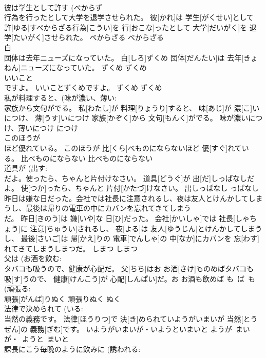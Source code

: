 \documentclass[8pt]{extreport}
\begin{document}
\begin{CJK}{UTF8}{min}
\\	彼は学生として許す (べからず 
\\	行為を行ったとして大学を退学させられた。	彼[かれ]は 学生[がくせい]として 許[ゆる]すべからざる行為[こうい]を 行[おこな]ったとして 大学[だいがく]を 退学[たいがく]させられた。	べからざる	べからざる	
\\	白 
\\	団体は去年ニューズになっていた。	白[しろ]ずくめ 団体[だんたい]は 去年[きょねん]ニューズになっていた。	ずくめ	ずくめ	
\\	いいこと 
\\	ですよ。	いいことずくめですよ。	ずくめ	ずくめ	
\\	私が料理すると、(味が濃い、薄い: 
\\	家族から文句がでる。	私[わたし]が 料理[りょうり]すると、 味[あじ]が 濃[こ]いにつけ、 薄[うす]いにつけ 家族[かぞく]から 文句[もんく]がでる。	味が濃いにつけ、薄いにつけ	につけ	
\\	このほうが 
\\	ほど優れている。	このほうが 比[くら]べものにならないほど 優[すぐ]れている。	比べものにならない	比べものにならない	
\\	道具が (出す: 
\\	だよ。使ったら、ちゃんと片付けなさい。	道具[どうぐ]が 出[だ]しっぱなしだよ。 使[つか]ったら、ちゃんと 片付[かたづ]けなさい。	出しっぱなし	っぱなし	
\\	昨日は嫌な日だった。会社では社長に注意されるし、夜は友人とけんかしてしまうし、最後は帰りの電車の中にカバンを忘れてきてしまう 
\\	だ。	昨日[きのう]は 嫌[いや]な 日[ひ]だった。 会社[かいしゃ]では 社長[しゃちょう]に 注意[ちゅうい]されるし、 夜[よる]は 友人[ゆうじん]とけんかしてしまうし、 最後[さいご]は 帰[かえ]りの 電車[でんしゃ]の 中[なか]にカバンを 忘[わす]れてきてしまうしまつだ。	しまつ	しまつ	
\\	父は (お酒を飲む: 
\\	タバコも吸うので、健康が心配だ。	父[ちち]はお お酒[さけ]ものめばタバコも 吸[す]うので、 健康[けんこう]が 心配[しんぱい]だ。お	お酒も飲めば	も~ば~も	
\\	(頑張る: 
\\	頑張[がんば]りぬく	頑張りぬく	ぬく	
\\	法律で決められて (いる: 
\\	当然の義務です。	法律[ほうりつ]で 決[き]められていようがいまいが 当然[とうぜん]の 義務[ぎむ]です。	いようがいまいが・いようといまいと	ようが~まいが・~ようと~まいと	
\\	課長にこう毎晩のように飲みに (誘われる: 

\end{CJK}
\end{document}
